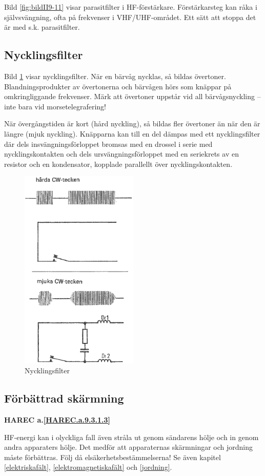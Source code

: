 Bild \ref{fig:bildII9-11} visar parasitfilter i HF-förstärkare.
Förstärkarsteg kan råka i självsvängning, ofta på frekvenser i VHF/UHF-området.
Ett sätt att stoppa det är med s.k. parasitfilter.

\subsection{Nycklingsfilter}

Bild \ref{fig:bildII9-12} visar nycklingsfilter.
När en bärvåg nycklas, så bildas övertoner.
Blandningsprodukter av övertonerna och bärvågen hörs som knäppar på
omkringliggande frekvenser.
Märk att övertoner uppstår vid all bärvågsnyckling -- inte bara vid
morsetelegrafering!

När övergångstiden är kort (hård nyckling), så bildas fler övertoner
än när den är längre (mjuk nyckling).
Knäpparna kan till en del dämpas med ett nycklingsfilter där dels
insvängningsförloppet bromsas med en drossel i serie med nycklingskontakten och
dels ursvängningsförloppet med en seriekrets av en resistor och en kondensator,
kopplade parallellt över nycklingskontakten.

\begin{figure}
  \includegraphics[width=0.5\textwidth]{images/cropped_pdfs/bild_2_9-12.pdf}
  \caption{Nycklingsfilter}
  \label{fig:bildII9-12}
\end{figure}

\subsection{Förbättrad skärmning}
\textbf{
HAREC a.\ref{HAREC.a.9.3.1.3}\label{myHAREC.a.9.3.1.3}
}

HF-energi kan i olyckliga fall även stråla ut genom sändarens hölje
och in genom andra apparaters hölje.
Det medför att apparaternas skärmningar och jordning måste förbättras.
Följ då elsäkerhetsbestämmelserna!
Se även kapitel \ref{elektriskafält}, \ref{elektromagnetiskafält} och
\ref{jordning}.
